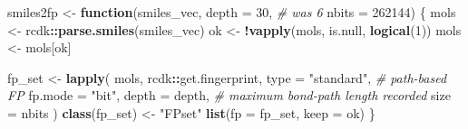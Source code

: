 \documentclass[
]{article}
\newenvironment{Shaded}{\begin{snugshade}}{\end{snugshade}}
\newcommand{\AttributeTok}[1]{\textcolor[rgb]{0.13,0.29,0.53}{#1}}
\newcommand{\CommentTok}[1]{\textcolor[rgb]{0.56,0.35,0.01}{\textit{#1}}}
\newcommand{\ControlFlowTok}[1]{\textcolor[rgb]{0.13,0.29,0.53}{\textbf{#1}}}
\newcommand{\DecValTok}[1]{\textcolor[rgb]{0.00,0.00,0.81}{#1}}
\newcommand{\FunctionTok}[1]{\textcolor[rgb]{0.13,0.29,0.53}{\textbf{#1}}}
\newcommand{\NormalTok}[1]{#1}
\newcommand{\OtherTok}[1]{\textcolor[rgb]{0.56,0.35,0.01}{#1}}
\newcommand{\SpecialCharTok}[1]{\textcolor[rgb]{0.81,0.36,0.00}{\textbf{#1}}}
\newcommand{\StringTok}[1]{\textcolor[rgb]{0.31,0.60,0.02}{#1}}
\begin{document}
\begin{Shaded}
\begin{Highlighting}[]
\NormalTok{smiles2fp }\OtherTok{\textless{}{-}} \ControlFlowTok{function}\NormalTok{(smiles\_vec,}
                      \AttributeTok{depth =} \DecValTok{30}\NormalTok{,        }\CommentTok{\# was 6}
                      \AttributeTok{nbits =} \DecValTok{262144}\NormalTok{) \{}
\NormalTok{  mols }\OtherTok{\textless{}{-}}\NormalTok{ rcdk}\SpecialCharTok{::}\FunctionTok{parse.smiles}\NormalTok{(smiles\_vec)}
\NormalTok{  ok   }\OtherTok{\textless{}{-}} \SpecialCharTok{!}\FunctionTok{vapply}\NormalTok{(mols, is.null, }\FunctionTok{logical}\NormalTok{(}\DecValTok{1}\NormalTok{))}
\NormalTok{  mols }\OtherTok{\textless{}{-}}\NormalTok{ mols[ok]}

\NormalTok{  fp\_set }\OtherTok{\textless{}{-}} \FunctionTok{lapply}\NormalTok{(}
\NormalTok{    mols,}
\NormalTok{    rcdk}\SpecialCharTok{::}\NormalTok{get.fingerprint,}
    \AttributeTok{type     =} \StringTok{"standard"}\NormalTok{,   }\CommentTok{\# path{-}based FP}
    \AttributeTok{fp.mode  =} \StringTok{"bit"}\NormalTok{,}
    \AttributeTok{depth    =}\NormalTok{ depth,        }\CommentTok{\# maximum bond{-}path length recorded}
    \AttributeTok{size     =}\NormalTok{ nbits}
\NormalTok{  )}
  \FunctionTok{class}\NormalTok{(fp\_set) }\OtherTok{\textless{}{-}} \StringTok{"FPset"}
  \FunctionTok{list}\NormalTok{(}\AttributeTok{fp =}\NormalTok{ fp\_set, }\AttributeTok{keep =}\NormalTok{ ok)}
\NormalTok{\}}





\end{Highlighting}
\end{Shaded}
\end{document}
